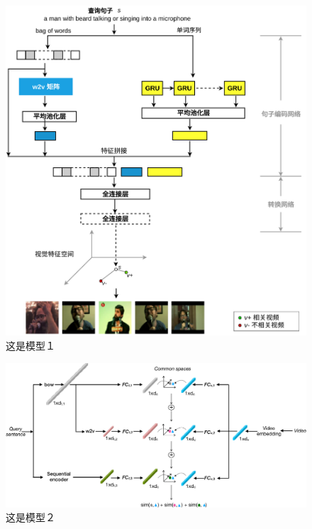 \begin{figure}[tbh!]
    \centering
    \includegraphics[width=\linewidth]{figures/model1}
    \caption[模型１]{这是模型１}
    \label{fig:model1}
\end{figure}

\begin{figure}[tbh!]
    \centering
    \includegraphics[width=\linewidth]{figures/model2}
    \caption[模型２]{这是模型２}
    \label{fig:model2}
\end{figure}

